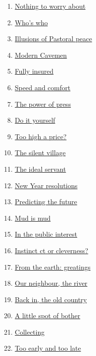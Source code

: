 \documentclass[11pt]{article}
\begin{document}
\begin{multicols}{2}
\begin{enumerate}
		\item \href{https://mp.weixin.qq.com/s/0hupFG4cPVmCgYF2mnlU9A}{Nothing to worry about}	%
		\item \href{https://mp.weixin.qq.com/s/CIttj4NncDyKZj9hcUN3GQ}{Who's who}	%
		\item \href{https://mp.weixin.qq.com/s/ll2jOFY6PnFoakM9qbe4aA}{Illusions of Pastoral peace}	%
		\item \href{https://mp.weixin.qq.com/s/qcNtkKp9gdjwWin93-hFxQ}{Modern Cavemen}	%
		\item \href{https://mp.weixin.qq.com/s/GrV2n9x53mphHxDM_QnfWw}{Fully insured}	%
		\item \href{https://mp.weixin.qq.com/s/wwguDMbLZJd9WTRL3mEEUQ}{Speed and comfort}	%
		\item \href{https://mp.weixin.qq.com/s/UuHzmL_aNE5bCzxWLMqjAg}{The power of press}	%
		\item \href{https://mp.weixin.qq.com/s/_bf0eAYbfI7Zq2hvYrVcEg}{Do it yourself}	%
		\item \href{https://mp.weixin.qq.com/s/X6cW9MbxdmvHltABEdhaWw}{Too high a price?}	%
		\item \href{https://mp.weixin.qq.com/s/Ujvwzv2ev7JCoNAE4KlXiQ}{The silent village}	%
		\item \href{https://mp.weixin.qq.com/s/BNWD9djUUGWbloVzada0wA}{The ideal servant}	%
		\item \href{https://mp.weixin.qq.com/s/vOYCj5lrK11Wee6TIqQLuQ}{ New Year resolutions}	%
		\item \href{https://mp.weixin.qq.com/s/bER2nBS_qfePZrm2JlvW6A}{Predicting the future}	%
		\item \href{https://mp.weixin.qq.com/s/KW7jxe-Lgv7CN1qsyiQ7cQ}{Mud is mud}	%
		\item \href{https://mp.weixin.qq.com/s/NgknyoA4SyJg851n-qfBkA}{In the public interest}	%
		\item \href{https://mp.weixin.qq.com/s/zqjH2u7SFdt5q6cApCyM9A}{Instinct ct or cleverness?}	%
		\item \href{https://mp.weixin.qq.com/s/edDJQUtxajFPppCJ3dN8CQ}{From the earth: greatings}	%
		\item \href{https://mp.weixin.qq.com/s/tyNkWDFE6nj4eRXwuwsiXw}{Our neighbour, the river}	%
		\item \href{https://mp.weixin.qq.com/s/53gA5Ukocec_4SnipGEJFA}{Back in, the old country}	%
		\item \href{https://mp.weixin.qq.com/s/yPPiHNZ3wVkb4B-746mnbg}{A little spot of bother}	%
		\item \href{https://mp.weixin.qq.com/s/usGQts7arsVY-kKMUHG7aQ}{Collecting}	%
		\item \href{https://mp.weixin.qq.com/s/oQJcIHY5RffFZmZImaZFrg}{Too early and too late}	%
	\end{enumerate}
\end{multicols} 
\end{document}
